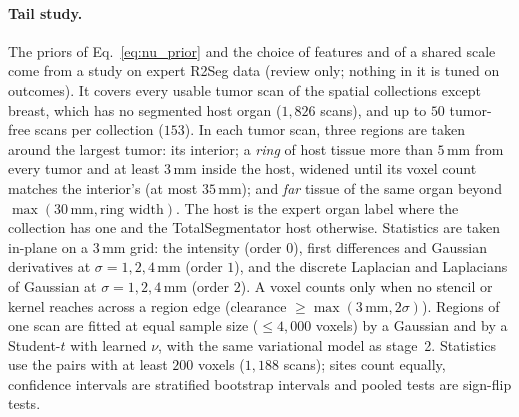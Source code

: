 \documentclass[fleqn,10pt]{olplainarticle}
\begin{document}
\paragraph{Tail study.} The priors of Eq.~\eqref{eq:nu_prior} and the choice of features and of a shared scale come from a
study on expert R2Seg data (review only; nothing in it is tuned on outcomes). It covers every usable tumor scan of the spatial
collections except breast, which has no segmented host organ ($1{,}826$ scans), and up to $50$ tumor-free scans per
collection ($153$). In each tumor scan, three regions are taken around the largest tumor: its interior; a \emph{ring} of host
tissue more than $5$\,mm from every tumor and at least $3$\,mm inside the host, widened until its voxel count matches the
interior's (at most $35$\,mm); and \emph{far} tissue of the same organ beyond $\max(30\,\mathrm{mm},\text{ring width})$. The host
is the expert organ label where the collection has one and the TotalSegmentator host otherwise. Statistics are taken in-plane on
a $3$\,mm grid: the intensity (order $0$), first differences and Gaussian derivatives at $\sigma=1,2,4$\,mm (order $1$), and
the discrete Laplacian and Laplacians of Gaussian at $\sigma=1,2,4$\,mm (order $2$). A voxel counts only when no stencil or
kernel reaches across a region edge (clearance $\ge\max(3\,\mathrm{mm},2\sigma)$). Regions of one scan are fitted at equal
sample size ($\le4{,}000$ voxels) by a Gaussian and by a Student-$t$ with learned $\nu$, with the same variational model as
stage~2. Statistics use the pairs with at least $200$ voxels ($1{,}188$ scans); sites count equally, confidence intervals are
stratified bootstrap intervals and pooled tests are sign-flip tests.
\end{document}
